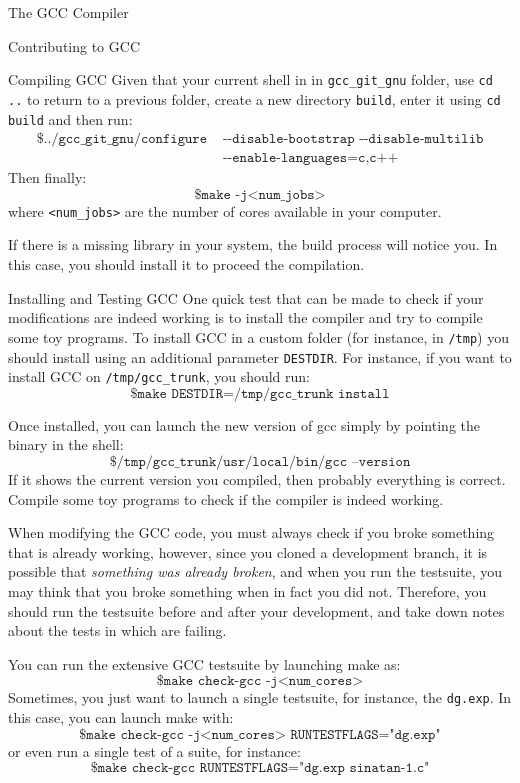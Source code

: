 \begin{section}{The GCC Compiler}
\begin{section}{Contributing to GCC}
\begin{subsection}{Compiling GCC}
Given that your current shell in in \texttt{gcc\_git\_gnu} folder, use \texttt{cd ..}
to return to a previous folder, create a new directory \texttt{build}, enter it
using \texttt{cd build} and then run:
\begin{align}
\texttt{\$ ../gcc\_git\_gnu/configure} & \texttt{ -{}-disable-bootstrap -{}-disable-multilib} \nonumber \\
& \texttt{ -{}-enable-languages=c,c++} \nonumber
\end{align}
Then finally:
$$\texttt{\$ make -j<num\_jobs>}$$
where \texttt{<num\_jobs>} are the number of cores available in your computer.

If there is a missing library in your system, the build process will notice
you. In this case, you should install it to proceed the compilation.
\end{subsection}

\begin{subsection}{Installing and Testing GCC}
One quick test that can be made to check if your modifications are indeed
working is to install the compiler and try to compile some toy programs.
To install GCC in a custom folder (for instance, in \texttt{/tmp}) you
should install using an additional parameter \texttt{DESTDIR}. For instance,
if you want to install GCC on \texttt{/tmp/gcc\_trunk}, you should run:
$$\texttt{\$ make DESTDIR=/tmp/gcc\_trunk install}$$

Once installed, you can launch the new version of gcc simply by pointing
the binary in the shell:
$$\texttt{\$ /tmp/gcc\_trunk/usr/local/bin/gcc --version}$$
If it shows the current version you compiled, then probably everything is
correct. Compile some toy programs to check if the compiler is indeed working.

When modifying the GCC code, you must always check if you broke something
that is already working, however, since you cloned a development branch,
it is possible that \textit{something was already broken}, and when you
run the testsuite, you may think that you broke something when in fact
you did not. Therefore, you should run the testsuite before and after your
development, and take down notes about the tests in which are failing.

You can run the extensive GCC testsuite by launching make as:
$$\texttt{\$ make check-gcc -j<num\_cores>}$$
Sometimes, you just want to launch a single testsuite, for instance,
the \texttt{dg.exp}. In this case, you can launch make with:
$$\texttt{\$ make check-gcc -j<num\_cores> RUNTESTFLAGS="dg.exp"}$$
or even run a single test of a suite, for instance:
$$\texttt{\$ make check-gcc RUNTESTFLAGS="dg.exp sinatan-1.c"}$$


\end{subsection}
\end{section}
\end{section}
